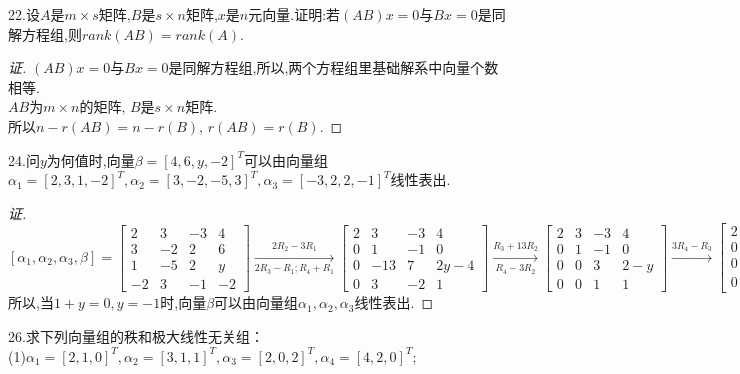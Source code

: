 \documentclass[10pt,a4paper]{report}
\begin{document}
\noindent 22.设$A$是$m \times s$矩阵,$B$是$s \times n$矩阵,$x$是$n$元向量.证明:若$(AB)x=0$与$Bx=0$是同解方程组,则$rank(AB)=rank(A)$.
\begin{proof}[证]
	$(AB)x=0$与$Bx=0$是同解方程组,所以,两个方程组里基础解系中向量个数相等.\\
	$AB$为$m \times n$的矩阵, $B$是$s \times n$矩阵.\\
	所以$n-r(AB) = n-r(B)$, $r(AB)=r(B)$.
\end{proof}
\noindent 24.问$y$为何值时,向量$\beta = [4,6,y,-2]^{T}$可以由向量组$\alpha_{1} = [2,3,1,-2]^{T}, \alpha_{2} = [3,-2,-5,3]^{T},\alpha_{3} = [-3,2,2,-1]^{T}$线性表出.
\begin{proof}[证]
	$[\alpha_{1},\alpha_{2},\alpha_{3},\beta] = \left[
	\begin{matrix}
	2 & 3 & -3 & 4 \\
	3 & -2 & 2 & 6  \\
	1 & -5 & 2 & y\\
	-2 & 3 & -1 & -2
	\end{matrix}
	\right] \xrightarrow[2R_{3}-R_{1};R_{4}+R_{1}]{2R_{2}-3R_{1}} \left[
	\begin{matrix}
	2 & 3 & -3 & 4 \\
	0 & 1 & -1 & 0  \\
	0 & -13 & 7 & 2y-4\\
	0 & 3 & -2 & 1
	\end{matrix} 
	\right] \xrightarrow[R_{4}-3R_{2}]{R_{3}+13R_{2}} \left[
	\begin{matrix}
	2 & 3 & -3 & 4 \\
	0 & 1 & -1 & 0  \\
	0 & 0 & 3 & 2-y\\
	0 & 0 & 1 & 1
	\end{matrix} 
	\right] \xrightarrow{3R_{4}-R_{3}} \left[
	\begin{matrix}
	2 & 3 & -3 & 4 \\
	0 & 1 & -1 & 0  \\
	0 & 0 & 3 & 2-y\\
	0 & 0 & 0 & 1+y
	\end{matrix} 
	\right]$\\
	所以,当$1+y=0,y=-1$时,向量$\beta$可以由向量组$\alpha_{1}, \alpha_{2},\alpha_{3}$线性表出.
\end{proof}
\noindent 26.求下列向量组的秩和极大线性无关组：\\
\noindent (1)$\alpha_{1}=[2,1,0]^{T}, \alpha_{2}=[3,1,1]^{T}, \alpha_{3}=[2,0,2]^{T}, \alpha_{4}=[4,2,0]^{T}$;
\end{document}
